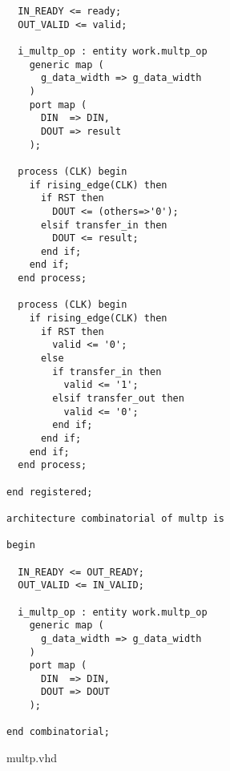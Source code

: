 \begin{code}
\begin{verbatim}
  IN_READY <= ready;
  OUT_VALID <= valid;

  i_multp_op : entity work.multp_op
    generic map (
      g_data_width => g_data_width
    )
    port map (
      DIN  => DIN,
      DOUT => result
    );

  process (CLK) begin
    if rising_edge(CLK) then
      if RST then
        DOUT <= (others=>'0');
      elsif transfer_in then
        DOUT <= result;
      end if;
    end if;
  end process;

  process (CLK) begin
    if rising_edge(CLK) then
      if RST then
        valid <= '0';
      else
        if transfer_in then
          valid <= '1';
        elsif transfer_out then
          valid <= '0';
        end if;
      end if;
    end if;
  end process;

end registered;

architecture combinatorial of multp is

begin

  IN_READY <= OUT_READY;
  OUT_VALID <= IN_VALID;

  i_multp_op : entity work.multp_op
    generic map (
      g_data_width => g_data_width
    )
    port map (
      DIN  => DIN,
      DOUT => DOUT
    );

end combinatorial;
\end{verbatim}
\caption{multp.vhd}
\label{ap-cod:6}
\end{code}

